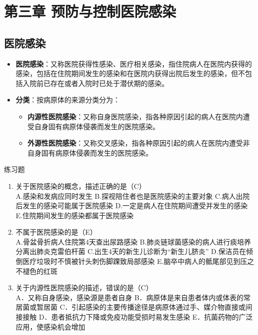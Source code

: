 \documentclass[11pt, a4paper]{ctexart}
\begin{document}
\section{第三章 预防与控制医院感染}
\subsection{医院感染}
\begin{itemize}
    \item \textbf{医院感染}：又称医院获得性感染、医疗相关感染，指住院病人在医院内获得的感染，包括在住院期间发生的感染和在医院内获得出院后发生的感染，但不包括入院前已存在或者入院时已处于潜伏期的感染。
    \item \textbf{分类}：按病原体的来源分类分为：
    \begin{itemize}
        \item \textbf{内源性医院感染}：又称自身医院感染，指各种原因引起的病人在医院内遭受自身固有病原体侵袭而发生的医院感染。
        \item \textbf{外源性医院感染}：又称交叉感染，指各种原因引起的病人在医院内遭受非自身固有病原体侵袭而发生的医院感染。
    \end{itemize}
\end{itemize}

\begin{examplebox}{练习题}
\begin{enumerate}
    \item 关于医院感染的概念，描述正确的是（C）\\
    A.感染和发病应同时发生 \quad B.探视陪住者也是医院感染的主要对象 \quad C.病人出院后发生的感染可能属于医院感染 \quad D.一定是病人在住院期间遭受并发生的感染 \quad E.住院期间发生的感染都属于医院感染
    \item 不属于医院感染的是（E）\\
    A.骨盆骨折病人住院第4天查出尿路感染 \quad B.肺炎链球菌感染的病人进行痰培养分离出肺炎克雷伯杆菌 \quad C.出生4天的新生儿诊断为“新生儿脐炎” \quad D.保洁员在倾倒医疗垃圾时不慎被针头刺伤脚踝致局部感染 \quad E.脑卒中病人的骶尾部见到压之不褪色的红斑
    \item 关于内源性医院感染的描述，错误的是（C）\\
    A．又称自身感染，感染源是患者自身 \quad B．病原体是来自患者体内或体表的常居菌或暂居菌 \quad C．引起感染的主要传播途径是病原体通过手、媒介物直接或间接接触 \quad D．患者抵抗力下降或免疫功能受损时易发生感染 \quad E．抗菌药物的广泛应用，使感染机会增加
\end{enumerate}
\end{examplebox}
\end{document}
